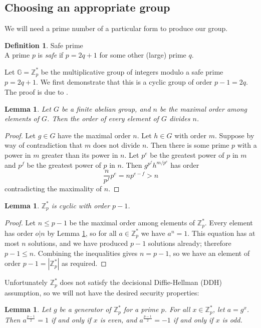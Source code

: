 \documentclass[11pt,twoside,a4paper]{article}
\newtheorem{lemma}[theorem]{Lemma}
\theoremstyle{definition}
\newtheorem{definition}{Definition}[section]
\begin{document}
\subsection{Choosing an appropriate group}
We will need a prime number of a particular form to produce our group.
\begin{definition}{Safe prime}\\
    A prime \(p\) is \textit{safe} if \(p=2q+1\) for some other (large) prime \(q\).
\end{definition}
Let \(\mathbb{G}=\mathbb{Z}^*_p\) be the multiplicative group of integers modulo a safe prime \(p=2q+1\). We first demonstrate that this is a cyclic group of order \(p-1=2q\). The proof is due to \cite{cyclicity}.
\begin{lemma}\label{lem-order-divides}
    Let \(G\) be a finite abelian group, and \(n\) be the maximal order among elements of \(G\). Then the order of every element of \(G\) divides \(n\).
\end{lemma}
\begin{proof}
    Let \(g\in G\) have the maximal order \(n\). Let \(h\in G\) with order \(m\). Suppose by way of contradiction that \(m\) does not divide \(n\). Then there is some prime \(p\) with a power in \(m\) greater than its power in \(n\). Let \(p^e\) be the greatest power of \(p\) in \(m\) and \(p^f\) be the greatest power of \(p\) in \(n\). Then \(g^{p^f}h^{m/p^e}\) has order
    \[\frac{n}{p^f}p^e=np^{e-f}>n\]
    contradicting the maximality of \(n\).
\end{proof}
\begin{lemma}
    \(\mathbb{Z}^*_p\) is cyclic with order \(p-1\).
\end{lemma}
\begin{proof}
    Let \(n\leq p-1\) be the maximal order among elements of \(\mathbb{Z}^*_p\). Every element has order \(o\vert n\) by Lemma \ref{lem-order-divides}, so for all \(a\in\mathbb{Z}^*_p\) we have \(a^n=1\). This equation has at most \(n\) solutions, and we have produced \(p-1\) solutions already; therefore \(p-1\leq n\).
    Combining the inequalities gives \(n=p-1\), so we have an element of order \(p-1=|\mathbb{Z}^*_p|\) as required.
\end{proof}
Unfortunately \(\mathbb{Z}^*_p\) does not satisfy the decisional Diffie-Hellman (DDH) assumption, so we will not have the desired security properties:
\begin{lemma}\label{lem-parity}
    Let \(g\) be a generator of \(\mathbb{Z}^*_p\) for a prime \(p\). For all \(x\in\mathbb{Z}^*_p\), let \(a=g^x\). Then \(a^{\frac{p-1}{2}} = 1\) if and only if \(x\) is even, and \(a^{\frac{p-1}{2}} = -1\) if and only if \(x\) is odd.
\end{lemma}
\end{document}
